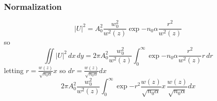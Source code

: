 %
%
%
\subsubsection{Normalization}
\begin{equation}
   |U|^2  = A^2_0 \frac{w_0^2}{w^2(z)} \exp{- n_0 \alpha \frac{r^2}{w^2(z)}} 
\end{equation}
so
\begin{equation}
\iint |U|^2 \, dx \, dy = 2 \pi A^2_0 \frac{w_0^2}{w^2(z)}  \int_{0}^{\infty}\exp{- n_0 \alpha\frac{r^2}{w^2(z)}} r \,dr
\end{equation}
letting $r = \frac{w(z)}{\sqrt{ n_0 \alpha }} x$ so $dr = \frac{w(z)}{\sqrt{ n_0 \alpha }} dx$
\begin{equation}
2 \pi A^2_0 \frac{w_0^2}{w^2(z)}  \int_{0}^{\infty}\exp{-r^2} \frac{w(z)}{\sqrt{ n_0 \alpha }} x \,\frac{w(z)}{\sqrt{ n_0 \alpha }} dx
\end{equation}


